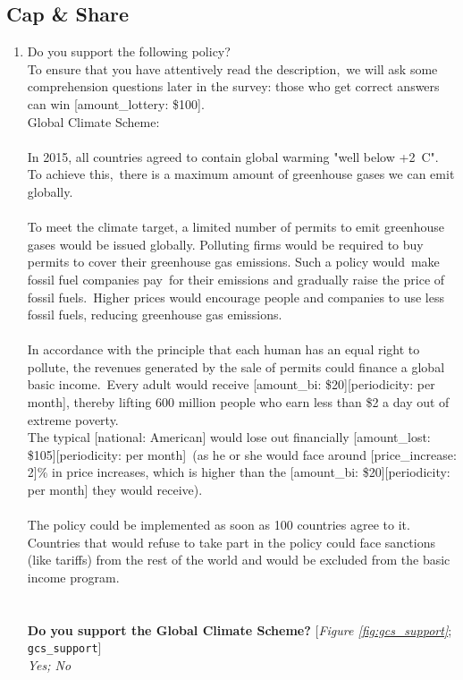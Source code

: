  \subsection*{Cap \& Share} 
 \begin{enumerate}[resume] 
\item  \label{q:gcs_support} Do you support the following policy?\\
To ensure that you have attentively read the description,~we will ask some comprehension questions later in the survey: those who get correct answers can win [amount\_lottery: \$100].
~\\
Global Climate Scheme:~\\\\
In 2015, all countries agreed to contain global warming "well below +2~\textdegree{}C". To achieve this,~there is a maximum amount of greenhouse gases we can emit globally.~\\\\
To meet the climate target, a limited number of permits to emit greenhouse gases would be issued globally. Polluting firms would be required to buy permits to cover their greenhouse gas emissions. Such a policy would~make fossil fuel companies pay~for their emissions and gradually raise the price of fossil fuels.~Higher prices would encourage people and companies to use less fossil fuels, reducing greenhouse gas emissions.\\\\
In accordance with the principle that each human has an equal right to pollute, the revenues generated by the sale of permits could finance a global basic income.~Every adult would receive [amount\_bi: \$20][periodicity: per month], thereby lifting 600 million people who earn less than \$2 a day out of extreme poverty.\\
The typical [national: American] would lose out financially [amount\_lost: \$105][periodicity: per month]~(as he or she would face around [price\_increase: 2]\% in price increases, which is higher than the [amount\_bi: \$20][periodicity: per month] they would receive).\\\\
The policy could be implemented as soon as 100 countries agree to it. Countries that would refuse to take part in the policy could face sanctions (like tariffs) from the rest of the world and would be excluded from the basic income program.\\\\
~\\\textbf{
Do you support the Global Climate Scheme?
} [\textit{Figure \ref{fig:gcs_support}}; 
\verb|gcs_support|]
  \\ \textit{Yes; No}


\end{enumerate}
